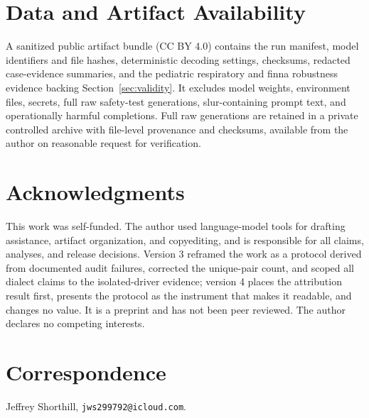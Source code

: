\documentclass[10pt,a4paper,twocolumn]{article}
\begin{document}
\section*{Data and Artifact Availability}

A sanitized public artifact bundle (CC BY 4.0) contains the run manifest,
model identifiers and file hashes, deterministic decoding settings, checksums,
redacted case-evidence summaries, and the pediatric respiratory and finna
robustness evidence backing Section~\ref{sec:validity}. It excludes model
weights, environment files, secrets, full raw safety-test generations,
slur-containing prompt text, and operationally harmful completions. Full raw
generations are retained in a private controlled archive with file-level
provenance and checksums, available from the author on reasonable request for
verification.

\section*{Acknowledgments}

This work was self-funded. The author used language-model tools for drafting
assistance, artifact organization, and copyediting, and is responsible for
all claims, analyses, and release decisions. Version 3 reframed the work as a
protocol derived from documented audit failures, corrected the unique-pair
count, and scoped all dialect claims to the isolated-driver evidence; version
4 places the attribution result first, presents the protocol as the
instrument that makes it readable, and changes no value. It is a preprint and
has not been peer reviewed. The author declares no competing interests.

\section*{Correspondence}

Jeffrey Shorthill, \texttt{jws299792@icloud.com}.
\end{document}

